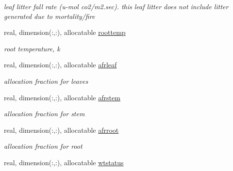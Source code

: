 \begin{DoxyCompactItemize}
\begin{DoxyCompactList}\small\item\em leaf litter fall rate (u-\/mol co2/m2.\+sec). this leaf litter does not include litter generated due to mortality/fire \end{DoxyCompactList}\item 
\hypertarget{structctem__statevars_1_1veg__gat_a3c2b2018ca9fccff9d9f70ba3c8363ab}{}real, dimension(\+:,\+:), allocatable \hyperlink{structctem__statevars_1_1veg__gat_a3c2b2018ca9fccff9d9f70ba3c8363ab}{roottemp}\label{structctem__statevars_1_1veg__gat_a3c2b2018ca9fccff9d9f70ba3c8363ab}

\begin{DoxyCompactList}\small\item\em root temperature, k \end{DoxyCompactList}\item 
\hypertarget{structctem__statevars_1_1veg__gat_aa78bfdc1d005c92664ed2fafb724ef67}{}real, dimension(\+:,\+:), allocatable \hyperlink{structctem__statevars_1_1veg__gat_aa78bfdc1d005c92664ed2fafb724ef67}{afrleaf}\label{structctem__statevars_1_1veg__gat_aa78bfdc1d005c92664ed2fafb724ef67}

\begin{DoxyCompactList}\small\item\em allocation fraction for leaves \end{DoxyCompactList}\item 
\hypertarget{structctem__statevars_1_1veg__gat_a194883b004cfcfd925d7e7c2688b29c5}{}real, dimension(\+:,\+:), allocatable \hyperlink{structctem__statevars_1_1veg__gat_a194883b004cfcfd925d7e7c2688b29c5}{afrstem}\label{structctem__statevars_1_1veg__gat_a194883b004cfcfd925d7e7c2688b29c5}

\begin{DoxyCompactList}\small\item\em allocation fraction for stem \end{DoxyCompactList}\item 
\hypertarget{structctem__statevars_1_1veg__gat_a761d02e761e0451993829ecbfaca4250}{}real, dimension(\+:,\+:), allocatable \hyperlink{structctem__statevars_1_1veg__gat_a761d02e761e0451993829ecbfaca4250}{afrroot}\label{structctem__statevars_1_1veg__gat_a761d02e761e0451993829ecbfaca4250}

\begin{DoxyCompactList}\small\item\em allocation fraction for root \end{DoxyCompactList}\item 
\hypertarget{structctem__statevars_1_1veg__gat_aaf2604f7f0b16ae6495f686b2cf74de7}{}real, dimension(\+:,\+:), allocatable \hyperlink{structctem__statevars_1_1veg__gat_aaf2604f7f0b16ae6495f686b2cf74de7}{wtstatus}\label{structctem__statevars_1_1veg__gat_aaf2604f7f0b16ae6495f686b2cf74de7}


\end{DoxyCompactItemize}
